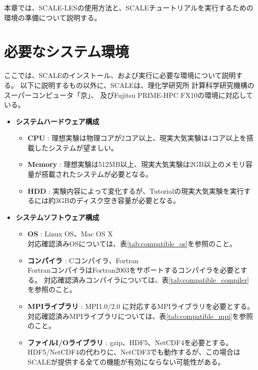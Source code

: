 
本章では、SCALE-LESの使用方法と、SCALEチュートリアルを実行するための環境の準備について説明する。

\section{必要なシステム環境}
\label{sec:req_env}
ここでは、SCALEのインストール、および実行に必要な環境について説明する。
以下に説明するもの以外に、SCALEは、理化学研究所 計算科学研究機構のスーパーコンピュータ「京」、
及びFujitsu PRIME-HPC FX10の環境に対応している。

\begin{itemize}
  \item {\bf システムハードウェア構成}
  \begin{itemize}
    \item {\bf CPU} : 理想実験は物理コアが2コア以上、現実大気実験は4コア以上を搭載したシステムが望ましい。
    \item {\bf Memory} : 理想実験は512MB以上、現実大気実験は2GB以上のメモリ容量が搭載されたシステムが必要となる。
    \item {\bf HDD} : 実験内容によって変化するが、Tutorialの現実大気実験を実行するには約3GBのディスク空き容量が必要となる。
  \end{itemize}

  \item {\bf システムソフトウェア構成}
  \begin{itemize}
  \item {\bf OS} : Linux OS、Mac OS X\\
        対応確認済みOSについては、表\ref{tab:compatible_os}を参照のこと。
  \item {\bf コンパイラ} : Cコンパイラ、Fortran\\
        FortranコンパイラはFortran2003をサポートするコンパイラを必要とする。
        対応確認済みコンパイラについては、表\ref{tab:compatible_compiler}を参照のこと。
  \item {\bf MPIライブラリ} : MPI1.0/2.0 に対応するMPIライブラリを必要とする。
        対応確認済みMPIライブラリについては、表\ref{tab:compatible_mpi}を参照のこと。
  \item {\bf ファイルI/Oライブラリ} : gzip、HDF5、NetCDF4を必要とする。\\
        HDF5/NetCDF4の代わりに、NetCDF3でも動作するが、この場合はSCALEが提供する全ての機能が有効にならない可能性がある。
  \end{itemize}
\end{itemize}


